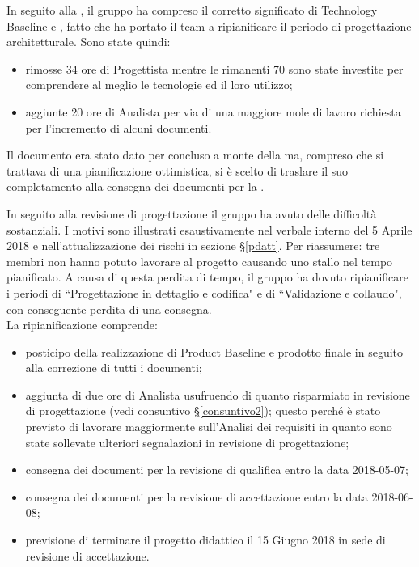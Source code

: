 
In seguito alla \RR{}, il gruppo ha compreso il corretto significato di Technology Baseline e , fatto che ha portato il team a ripianificare il periodo di progettazione architetturale. Sono state quindi:

\begin{itemize}
\item rimosse 34 ore di Progettista mentre le rimanenti 70 sono state investite per comprendere al meglio le tecnologie ed il loro utilizzo;
\item aggiunte 20 ore di Analista per via di una maggiore mole di lavoro richiesta per l'incremento di alcuni documenti.
\end{itemize}

Il documento \AnalisiRequisiti{} era stato dato per concluso a monte della \RR{} ma, compreso che si trattava di una pianificazione ottimistica, si è scelto di traslare
il suo completamento alla consegna dei documenti per la \RP{}.

 \label{inSeguitoRP}

In seguito alla revisione di progettazione il gruppo ha avuto delle difficoltà sostanziali. I motivi sono illustrati esaustivamente nel verbale interno del 5 Aprile 2018 e nell'attualizzazione dei rischi in sezione §\ref{pdatt}. Per riassumere: tre membri non hanno potuto lavorare al progetto causando uno stallo nel tempo pianificato. A causa di questa perdita di tempo, il gruppo ha dovuto ripianificare i periodi di ``Progettazione in dettaglio e codifica" e di ``Validazione e collaudo", con conseguente perdita di una consegna. \\
La ripianificazione comprende:
\begin{itemize}
	\item posticipo della realizzazione di Product Baseline e prodotto finale in seguito alla correzione di tutti i documenti;
	\item aggiunta di due ore di Analista usufruendo di quanto risparmiato in revisione di progettazione (vedi consuntivo §\ref{consuntivo2}); 		questo perché è stato previsto di lavorare maggiormente sull'Analisi dei requisiti in quanto sono state sollevate ulteriori segnalazioni 		in revisione di progettazione;
	\item consegna dei documenti per la revisione di qualifica entro la data 2018-05-07;
	\item consegna dei documenti per la revisione di accettazione entro la data 2018-06-08;
	\item previsione di terminare il progetto didattico il 15 Giugno 2018 in sede di revisione di accettazione.
\end{itemize}

